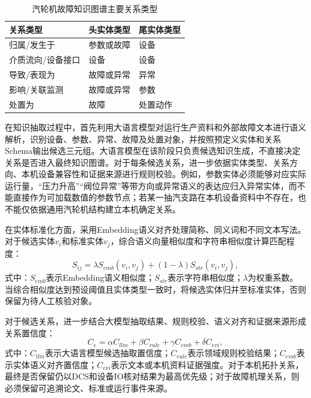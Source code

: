 \begin{table}[htbp]
    \centering
    \caption{汽轮机故障知识图谱主要关系类型}
    \label{tab:kg_relation_types_v4}
    \begin{tabular}{lll}
        \toprule
        关系类型 & 头实体类型 & 尾实体类型 \\
        \midrule
        归属/发生于 & 参数或故障 & 设备 \\
        介质流向/设备接口 & 设备 & 设备 \\
        导致/表现为 & 故障或异常 & 异常 \\
        影响/关联监测 & 故障或异常 & 参数 \\
        处置为 & 故障 & 处置动作 \\
        \bottomrule
    \end{tabular}
\end{table}

在知识抽取过程中，首先利用大语言模型对运行生产资料和外部故障文本进行语义解析，识别设备、参数、异常、故障及处置对象，并按照预定义实体和关系Schema输出候选三元组。大语言模型在该阶段只负责候选知识生成，不直接决定关系是否进入最终知识图谱。对于每条候选关系，进一步依据实体类型、关系方向、本机设备兼容性和证据来源进行规则校验。例如，参数实体必须能够对应实际运行量，“压力升高”“阀位异常”等带方向或异常语义的表达应归入异常实体，而不能直接作为可加载数值的参数节点；若某一抽汽支路在本机设备资料中不存在，也不能仅依据通用汽轮机结构建立本机确定关系。

在实体标准化方面，采用Embedding语义对齐处理简称、同义词和不同文本写法\cite{Reimers2019SentenceBERT}。对于候选实体$v_i$和标准实体$v_j$，综合语义向量相似度和字符串相似度计算匹配程度：
\begin{equation}
S_{ij}=\lambda S_{emb}(v_i,v_j)+(1-\lambda)S_{str}(v_i,v_j),
\end{equation}
式中：$S_{emb}$表示Embedding语义相似度；$S_{str}$表示字符串相似度；$\lambda$为权重系数。当综合相似度达到预设阈值且实体类型一致时，将候选实体归并至标准实体，否则保留为待人工核验对象。

对于候选关系，进一步结合大模型抽取结果、规则校验、语义对齐和证据来源形成关系置信度：
\begin{equation}
C_e=\alpha C_{llm}+\beta C_{rule}+\gamma C_{emb}+\delta C_{evi},
\end{equation}
式中：$C_{llm}$表示大语言模型候选抽取置信度；$C_{rule}$表示领域规则校验结果；$C_{emb}$表示实体语义对齐置信度；$C_{evi}$表示文本或本机资料证据强度。对于本机拓扑关系，最终是否保留仍以DCS和设备IO核对结果为最高优先级；对于故障机理关系，则必须保留可追溯论文、标准或运行事件来源。

